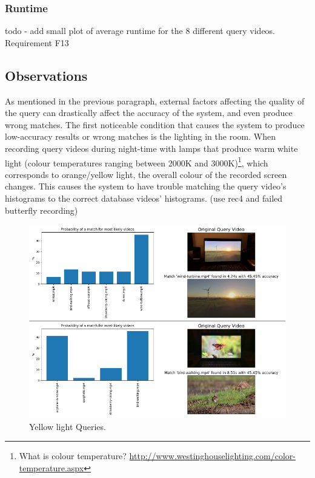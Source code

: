 \subsubsection{Runtime}

todo - add small plot of average runtime for the 8 different query videos. Requirement F13

\subsection{Observations}
\label{sec:evaluation-observations-online-phase}

As mentioned in the previous paragraph, external factors affecting the quality of the query can drastically affect the accuracy of the system, and even produce wrong matches. The first noticeable condition that causes the system to produce low-accuracy results or wrong matches is the lighting in the room. When recording query videos during night-time with lamps that produce warm white light (colour temperatures ranging between 2000K and 3000K)\footnote{What is colour temperature? \url{http://www.westinghouselighting.com/color-temperature.aspx}}, which corresponds to orange/yellow light, the overall colour of the recorded screen changes. This causes the system to have trouble matching the query video's histograms to the correct database videos' histograms. (use rec4 and failed butterfly recording)

\begin{figure}[h] 
\centerline{\includegraphics[width=\textwidth]{figures/evaluation/yellow-light-queries.png}}
\caption{\label{fig:evaluation-yellow-light-queries}Yellow light Queries.}
\end{figure}

